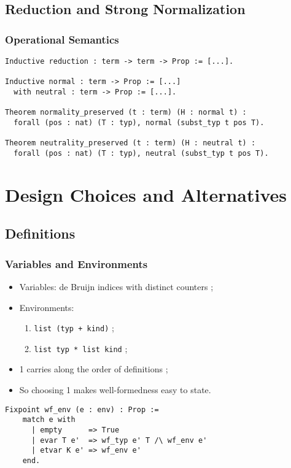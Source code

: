 \documentclass{beamer}
\begin{document}
\subsection{Reduction and Strong Normalization}

\begin{frame}[fragile]

\frametitle{Operational Semantics}

\begin{verbatim}
Inductive reduction : term -> term -> Prop := [...].

Inductive normal : term -> Prop := [...]
  with neutral : term -> Prop := [...].

Theorem normality_preserved (t : term) (H : normal t) :
  forall (pos : nat) (T : typ), normal (subst_typ t pos T).

Theorem neutrality_preserved (t : term) (H : neutral t) :
  forall (pos : nat) (T : typ), neutral (subst_typ t pos T).
\end{verbatim}


\end{frame}

\section{Design Choices and Alternatives}

\subsection{Definitions}

\begin{frame}[fragile]

\frametitle{Variables and Environments}

\begin{itemize}
\item Variables: de Bruijn indices with distinct counters ;
\item Environments:
  \begin{enumerate}
    \item \verb|list (typ + kind)| ;
    \item \verb|list typ * list kind| ;
  \end{enumerate}
\item 1 carries along the order of definitions ;
\item So choosing 1 makes well-formedness easy to state.
\end{itemize}

\begin{verbatim}
Fixpoint wf_env (e : env) : Prop :=
    match e with
      | empty      => True
      | evar T e'  => wf_typ e' T /\ wf_env e'
      | etvar K e' => wf_env e'
    end.
\end{verbatim}

\end{frame}
\end{document}
